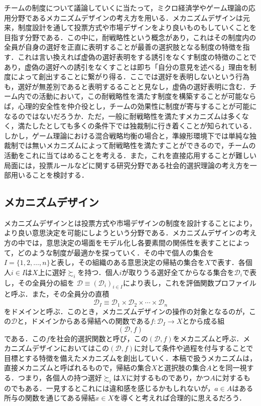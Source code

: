 \documentclass[a4paper, 11pt]{jsarticle}
\begin{document}
チームの制度について議論していくに当たって，ミクロ経済学やゲーム理論の応用分野であるメカニズムデザインの考え方を用いる．メカニズムデザインは元来，制度設計を通して投票方式や市場デザインをより良いものもしていくことを目指す分野である．この中に，耐戦略性という概念があり，これはその制度内の全員が自身の選好を正直に表明することが最善の選択肢となる制度の特徴を指す．これは言い換えれば虚偽の選好表明をする誘引をなくす制度の特徴のことであり，虚偽の選好への誘引をなくすことは即ち「自分の意見を述べる」理由を制度によって創出することに繋がり得る．ここでは選好を表明しないという行為も，選好が無差別であると表明するることと見なし，虚偽の選好表明に含む．チーム内での活動において，この耐戦略性を満たす制度を構築することが可能ならば，心理的安全性を仲介役とし，チームの効果性に制度が寄与することが可能になるのではないだろうか．ただ，一般に耐戦略性を満たすメカニズムは多くなく，満たしたとしても多くの条件下では独裁制に行き着くことが知られている．しかし，ゲーム理論における混合戦略均衡の場合と，準線形環境下では単純な独裁制では無いメカニズムによって耐戦略性を満たすことができるので，チームの活動をこれに当てはめることを考える．また，これを直接応用することが難しい局面には，投票ルールなどに関する研究分野である社会的選択理論の考え方を一部用いることを検討する．

\subsection{メカニズムデザイン}
メカニズムデザインとは投票方式や市場デザインの制度を設計することにより，より良い意思決定を可能にしようという分野である．メカニズムデザインの考え方の中では，意思決定の場面をモデル化し各要素間の関係性を表すことによって，どのような制度が最適かを探っていく．その中で個人の集合を\(I = \{1,2,\dots,n\}\)と表し，その組織のある意思決定の帰結の集合を\(X\)で表す．各個人\(i \in I\)は\(X\)上に選好\(\succsim_i\)を持つ．個人\(i\)が取りうる選好全てからなる集合を\(\mathscr{D}_i\)で表し，その全員分の組を
\(\mathscr{D} \equiv (\mathscr{D}_i)_{i \in I}\)により表し，これを評価関数プロファイルと呼ぶ．また，その全員分の直積
\[\mathscr{D}_I \equiv \mathscr{D}_1 \times \mathscr{D}_2 \times \cdots \times \mathscr{D}_n\]
をドメインと呼ぶ．このとき，メカニズムデザインの操作の対象となるのが，この\(\mathscr{D}\)と，ドメインからある帰結への関数である\(f: \mathscr{D}_I \rightarrow X\)とから成る組\[(\mathscr{D}, f)\]である．この\(f\)を社会的選択関数と呼び，この\((\mathscr{D}, f)\)をメカニズムと呼ぶ．メカニズムデザインにおいてはこの\((\mathscr{D}, f)\)に対して条件や過程を付与することで目標とする特徴を備えたメカニズムを創出していく．本稿で扱うメカニズムは，直接メカニズムと呼ばれるもので，帰結の集合\(X\)と選択肢の集合\(A\)とを同一視する．つまり，各個人の持つ選好\(\succsim_i\)は\(X\)に対するものであり，かつ\(A\)に対するものでもある．一見するとこれには違和感を感じるかもしれないが，\(a \in A\)はある所与の関数を通じてある帰結\(x \in X\)を導くと考えれば合理的に思えるだろう．
\end{document}
